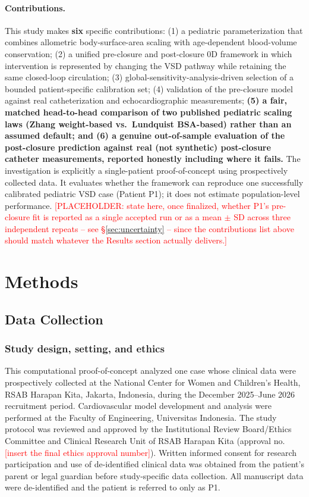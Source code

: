 \documentclass{article}
\begin{document}
\paragraph{Contributions.} This study makes \textbf{six} specific contributions: (1) a pediatric parameterization that combines allometric body-surface-area scaling with age-dependent blood-volume conservation; (2) a unified pre-closure and post-closure 0D framework in which intervention is represented by changing the VSD pathway while retaining the same closed-loop circulation; (3) global-sensitivity-analysis-driven selection of a bounded patient-specific calibration set; (4) validation of the pre-closure model against real catheterization and echocardiographic measurements; \textbf{(5) a fair, matched head-to-head comparison of two published pediatric scaling laws (Zhang weight-based vs.\ Lundquist BSA-based) rather than an assumed default; and (6) a genuine out-of-sample evaluation of the post-closure prediction against real (not synthetic) post-closure catheter measurements, reported honestly including where it fails.} The investigation is explicitly a single-patient proof-of-concept using prospectively collected data. It evaluates whether the framework can reproduce one successfully calibrated pediatric VSD case (Patient P1); it does not estimate population-level performance. \textcolor{red}{[PLACEHOLDER: state here, once finalized, whether P1's pre-closure fit is reported as a single accepted run or as a mean $\pm$ SD across three independent repeats -- see \S\ref{sec:uncertainty} -- since the contributions list above should match whatever the Results section actually delivers.]}


\section{Methods}
\subsection{Data Collection}
\label{sec:data_collection}

\subsubsection{Study design, setting, and ethics}

This computational proof-of-concept analyzed one case whose clinical data were prospectively collected at the National Center for Women and Children's Health, RSAB Harapan Kita, Jakarta, Indonesia, during the December 2025--June 2026 recruitment period. Cardiovascular model development and analysis were performed at the Faculty of Engineering, Universitas Indonesia. The study protocol was reviewed and approved by the Institutional Review Board/Ethics Committee and Clinical Research Unit of RSAB Harapan Kita (approval no. \textcolor{red}{[insert the final ethics approval number]}). Written informed consent for research participation and use of de-identified clinical data was obtained from the patient's parent or legal guardian before study-specific data collection. All manuscript data were de-identified and the patient is referred to only as P1.
\end{document}
